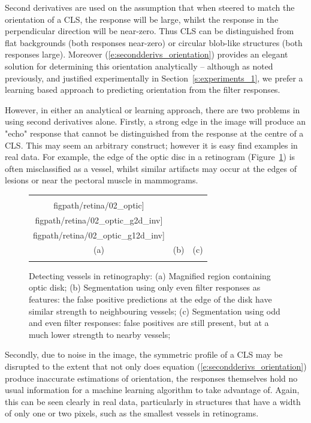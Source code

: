 \documentclass{IEEEtran}
\newcommand{\fref}[1]{Figure~\ref{#1}}
\newcommand{\eref}[1]{(\ref{#1})}
\newcommand{\sref}[1]{Section~\ref{#1}}
\def\figroot{./figs}
\def\figpath{\figroot}
\begin{document}
Second derivatives are used on the assumption that when steered to match the orientation of a CLS, the response will be large, whilst the response in the perpendicular direction will be near-zero. Thus CLS can be distinguished from flat backgrounds (both responses near-zero) or circular blob-like structures (both responses large). Moreover \eref{e:secondderivs_orientation} provides an elegant solution for determining this orientation analytically -- although as noted previously, and justified experimentally in \sref{s:experiments_1}, we prefer a learning based approach to predicting orientation from the filter responses.

However, in either an analytical or learning approach, there are two problems in using second derivatives alone. Firstly, a strong edge in the image will produce an "echo" response that cannot be distinguished from the response at the centre of a CLS. This may seem an arbitrary construct; however it is easy find examples in real data. For example, the edge of the optic disc in a retinogram (\fref{f:drive_odd_even}) is often misclassified as a vessel, whilst similar artifacts may occur at the edges of lesions or near the pectoral muscle in mammograms.

\begin{figure}[t]
\centering
\begin{tabular}{@{}c c c@{}}
\texttt{[image: \\figpath/retina/02\_optic]} &
\texttt{[image: \\figpath/retina/02\_optic\_g2d\_inv]} &
\texttt{[image: \\figpath/retina/02\_optic\_g12d\_inv]} \\
(a) & (b) & (c) \\
\noalign{\smallskip}
\end{tabular}
%
\caption{Detecting vessels in retinography: %
(a) Magnified region containing optic disk; %
(b) Segmentation using only even filter responses as features: the false positive predictions
at the edge of the disk have similar strength to neighbouring vessels; %
(c) Segmentation using odd and even filter responses: false positives are still present, but at a
much lower strength to nearby vessels;
}
\label{f:drive_odd_even}
\end{figure}

Secondly, due to noise in the image, the symmetric profile of a CLS may be disrupted to the extent that not only does equation \eref{e:secondderivs_orientation} produce inaccurate estimations of orientation, the responses themselves hold no usual information for a machine learning algorithm to take advantage of. Again, this can be seen clearly in real data, particularly in structures that have a width of only one or two pixels, such as the smallest vessels in retinograms.
\end{document}
